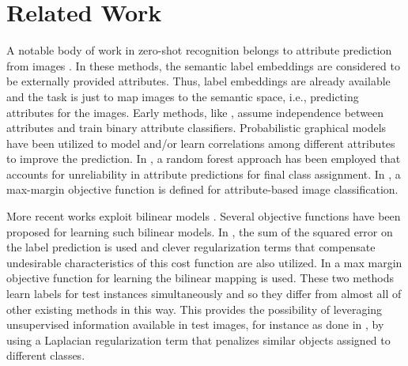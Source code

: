 \documentclass[letterpaper]{article}
\begin{document}
\section{Related Work} \label{related}

A notable body of work in zero-shot recognition belongs to attribute prediction from images \cite{lampert09,topicmodel,ajoint11,unified13,suzuki14}.
In these methods, the semantic label embeddings are considered to be externally provided attributes. Thus, label embeddings are already available
 and the task is just to map images to the semantic space, i.e., predicting attributes for the images.
Early methods, like \cite{lampert09}, assume independence between attributes and train binary attribute classifiers.
Probabilistic graphical models have been utilized to model and/or learn correlations among different attributes \cite{topicmodel,unified13}
 to improve the prediction.
In \cite{jayaraman14}, a random forest approach has been employed that accounts for unreliability in attribute predictions for final class assignment.
In \cite{Akata2015pami}, a max-margin objective function
is defined for attribute-based image classification.

More recent works exploit bilinear models \cite{Yu2013,devise,convex,sse,emb15,semi15}.
 Several objective functions have been proposed for learning such bilinear models.
In \cite{emb15}, the sum of the squared error on the label prediction is used and clever regularization
 terms that compensate undesirable characteristics of this cost function are also utilized.
In \cite{li15max,semi15} a max margin objective function for learning the bilinear mapping is used.
 These two methods learn labels for test instances simultaneously and so they differ from almost all of other existing methods in this way.
 This provides the possibility of
leveraging unsupervised information available in test images, for instance as done in \cite{semi15},
 by using a Laplacian regularization term that penalizes similar objects assigned to different classes.
\end{document}
